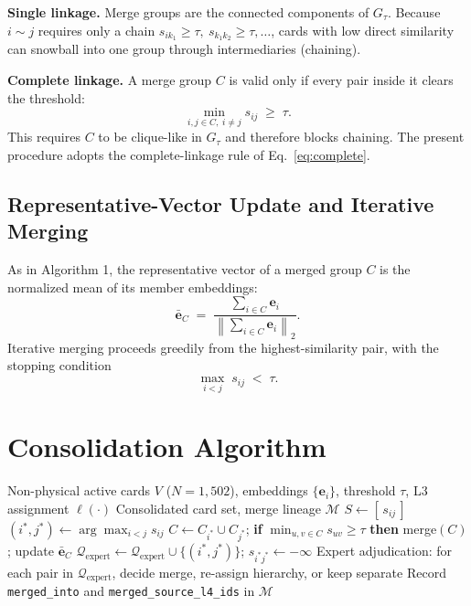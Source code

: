 \documentclass[11pt,a4paper]{article}
\begin{document}
\textbf{Single linkage.} Merge groups are the connected components of $G_\tau$. Because $i \sim j$ requires only a chain $s_{ik_1} \geq \tau,\ s_{k_1 k_2} \geq \tau, \dots$, cards with low direct similarity can snowball into one group through intermediaries (chaining).

\textbf{Complete linkage.} A merge group $C$ is valid only if every pair inside it clears the threshold:
\begin{equation}
\min_{i,j \in C,\; i \neq j} s_{ij} \;\geq\; \tau .
\label{eq:complete}
\end{equation}
This requires $C$ to be clique-like in $G_\tau$ and therefore blocks chaining. The present procedure adopts the complete-linkage rule of Eq.~\eqref{eq:complete}.

\subsection{Representative-Vector Update and Iterative Merging}

As in Algorithm 1, the representative vector of a merged group $C$ is the normalized mean of its member embeddings:
\begin{equation}
\bar{\mathbf{e}}_C \;=\; \frac{\sum_{i \in C} \mathbf{e}_i}{\left\lVert \sum_{i \in C} \mathbf{e}_i \right\rVert_2}.
\end{equation}
Iterative merging proceeds greedily from the highest-similarity pair, with the stopping condition
\begin{equation}
\max_{i<j} \; s_{ij} \;<\; \tau .
\end{equation}

\section{Consolidation Algorithm}

\begin{algorithm}[htbp]
\caption{Constrained Complete-Linkage Merge}
\begin{algorithmic}[1]
\Require Non-physical active cards $V$ ($N=1{,}502$), embeddings $\{\mathbf{e}_i\}$, threshold $\tau$, L3 assignment $\ell(\cdot)$
\Ensure Consolidated card set, merge lineage $\mathcal{M}$
\State $S \gets [\,s_{ij}\,]$ 
\Repeat
    \State $(i^*,j^*) \gets \arg\max_{i<j} s_{ij}$
         
            \State $C \gets C_{i^*} \cup C_{j^*}$;\; \textbf{if} $\min_{u,v \in C} s_{uv} \geq \tau$ \textbf{then} merge$(C)$; update $\bar{\mathbf{e}}_C$
        \Else {}
            \State $\mathcal{Q}_{\mathrm{expert}} \gets \mathcal{Q}_{\mathrm{expert}} \cup \{(i^*,j^*)\}$;\; $s_{i^*j^*} \gets -\infty$
        \EndIf
    \EndIf
{}
\State Expert adjudication: for each pair in $\mathcal{Q}_{\mathrm{expert}}$, decide merge, re-assign hierarchy, or keep separate
\State Record \texttt{merged\_into} and \texttt{merged\_source\_l4\_ids} in $\mathcal{M}$ 
\end{algorithmic}
\end{algorithm}
\end{document}
